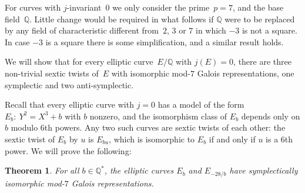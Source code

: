 \documentclass[12pt, reqno]{amsart}
\newcommand{\Q}{\mathbb{Q}}
\numberwithin{equation}{section}
\newtheorem{theorem}{Theorem}[section]
\theoremstyle{definition}
\theoremstyle{remark}
\begin{document}
For curves with $j$-invariant~$0$ we only consider the prime~$p=7$,
and the base field~$\Q$.  Little change would be required in what
follows if $\Q$ were to be replaced by any field of characteristic
different from~$2$, $3$ or $7$ in which $-3$ is not a square.  In case
$-3$ is a square there is some simplification, and a similar result
holds.

We will show that for every elliptic curve~$E/\Q$ with $j(E)=0$, there
are three non-trivial sextic twists of~$E$ with isomorphic mod-$7$
Galois representations, one symplectic and two anti-symplectic.

Recall that every elliptic curve with $j=0$ has a model of the form
$E_b:\ Y^2=X^3+b$ with $b$ nonzero, and the isomorphism class of $E_b$
depends only on $b$ modulo $6$th powers.  Any two such curves are
sextic twists of each other: the sextic twist of $E_b$ by $u$ is
$E_{bu}$, which is isomorphic to $E_b$ if and only if $u$ is a $6$th
power.  We will prove the following:

\begin{theorem}\label{T:j=0}
For all $b \in \Q^*$, the elliptic curves $E_b$ and $E_{-28/b}$ have
symplectically isomorphic mod-$7$ Galois representations.
\end{theorem}
\end{document}
